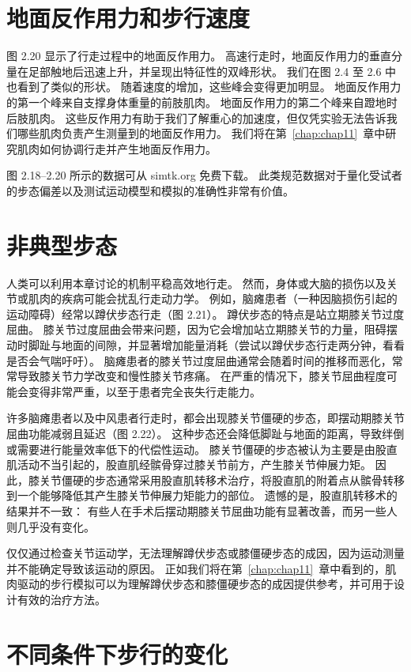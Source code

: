 \section{地面反作用力和步行速度}

图 2.20 显示了行走过程中的地面反作用力。
高速行走时，地面反作用力的垂直分量在足部触地后迅速上升，并呈现出特征性的双峰形状。
我们在图 2.4 至 2.6 中也看到了类似的形状。
随着速度的增加，这些峰会变得更加明显。
地面反作用力的第一个峰来自支撑身体重量的前肢肌肉。
地面反作用力的第二个峰来自蹬地时后肢肌肉。
这些反作用力有助于我们了解重心的加速度，但仅凭实验无法告诉我们哪些肌肉负责产生测量到的地面反作用力。
我们将在第~\ref{chap:chap11}~章中研究肌肉如何协调行走并产生地面反作用力。


图 2.18–2.20 所示的数据可从 simtk.org 免费下载。
此类规范数据对于量化受试者的步态偏差以及测试运动模型和模拟的准确性非常有价值。


\section{非典型步态}

人类可以利用本章讨论的机制平稳高效地行走。
然而，身体或大脑的损伤以及关节或肌肉的疾病可能会扰乱行走动力学。
例如，脑瘫患者（一种因脑损伤引起的运动障碍）经常以蹲伏步态行走（图 2.21）。
蹲伏步态的特点是站立期膝关节过度屈曲。
膝关节过度屈曲会带来问题，因为它会增加站立期膝关节的力量，阻碍摆动时脚趾与地面的间隙，并显著增加能量消耗（尝试以蹲伏步态行走两分钟，看看是否会气喘吁吁）。
脑瘫患者的膝关节过度屈曲通常会随着时间的推移而恶化，常常导致膝关节力学改变和慢性膝关节疼痛。
在严重的情况下，膝关节屈曲程度可能会变得非常严重，以至于患者完全丧失行走能力。


许多脑瘫患者以及中风患者行走时，都会出现膝关节僵硬的步态，即摆动期膝关节屈曲功能减弱且延迟（图 2.22）。
这种步态还会降低脚趾与地面的距离，导致绊倒或需要进行能量效率低下的代偿性运动。
膝关节僵硬的步态被认为主要是由股直肌活动不当引起的，股直肌经髌骨穿过膝关节前方，产生膝关节伸展力矩。
因此，膝关节僵硬的步态通常采用股直肌转移术治疗，将股直肌的附着点从髌骨转移到一个能够降低其产生膝关节伸展力矩能力的部位。
遗憾的是，股直肌转移术的结果并不一致：
有些人在手术后摆动期膝关节屈曲功能有显著改善，而另一些人则几乎没有变化。


仅仅通过检查关节运动学，无法理解蹲伏步态或膝僵硬步态的成因，因为运动测量并不能确定导致该运动的原因。
正如我们将在第~\ref{chap:chap11}~章中看到的，肌肉驱动的步行模拟可以为理解蹲伏步态和膝僵硬步态的成因提供参考，并可用于设计有效的治疗方法。


\section{不同条件下步行的变化}

